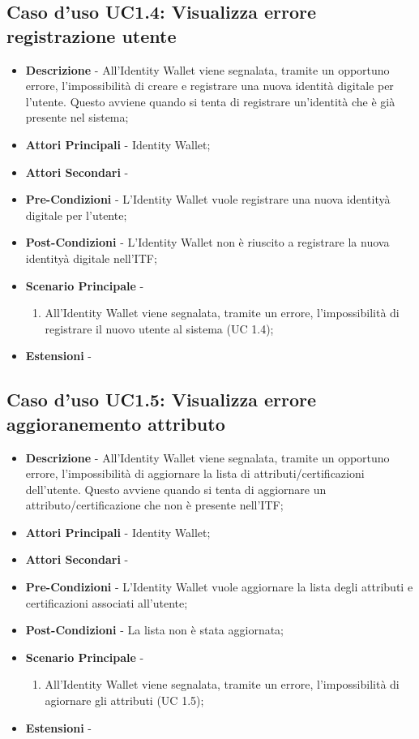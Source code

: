 \subsection{Caso d'uso UC1.4: Visualizza errore registrazione utente}
\begin{itemize}
	\item \textbf{Descrizione} - All'Identity Wallet viene segnalata, tramite un opportuno errore, l'impossibilità di creare e registrare una nuova identità digitale per l'utente. Questo avviene quando si tenta di registrare un'identità che è già presente nel sistema;
	\item \textbf{Attori Principali} - Identity Wallet;
	\item \textbf{Attori Secondari} -
	\item \textbf{Pre-Condizioni} - L'Identity Wallet vuole registrare una nuova identityà digitale per l'utente;
	\item \textbf{Post-Condizioni} - L'Identity Wallet non è riuscito a registrare la nuova identityà digitale nell'\gls{ITF};
	\item \textbf{Scenario Principale} -
	\begin{enumerate}
		\item All'Identity Wallet viene segnalata, tramite un errore, l'impossibilità di registrare il nuovo utente al sistema (UC 1.4);
	\end{enumerate}
	\item \textbf{Estensioni} -
\end{itemize}
\subsection{Caso d'uso UC1.5: Visualizza errore aggioranemento attributo}
\begin{itemize}
	\item \textbf{Descrizione} - All'Identity Wallet viene segnalata, tramite un opportuno errore, l'impossibilità di aggiornare la lista di attributi/certificazioni dell'utente. Questo avviene quando si tenta di aggiornare un attributo/certificazione che non è presente nell'\gls{ITF};
	\item \textbf{Attori Principali} - Identity Wallet;
	\item \textbf{Attori Secondari} -
	\item \textbf{Pre-Condizioni} - L'Identity Wallet vuole aggiornare la lista degli attributi e certificazioni associati all'utente;
	\item \textbf{Post-Condizioni} - La lista non è stata aggiornata;
	\item \textbf{Scenario Principale} -
	\begin{enumerate}
		\item All'Identity Wallet viene segnalata, tramite un errore, l'impossibilità di agiornare gli attributi (UC 1.5);
	\end{enumerate}
	\item \textbf{Estensioni} -
\end{itemize}
